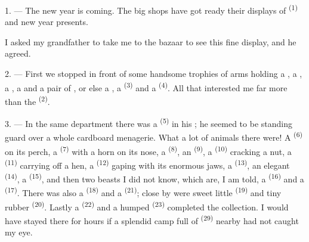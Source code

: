 %

\VUsaut{4.0mm}
\VUsaut{2.0mm}
\VUsaut{3.4mm}

1. --- The new year is coming. The big shops have got ready their displays of 
\textsuperscript{(1)} and new year presents.

I asked my grandfather to take me to the bazaar to see this fine display, and he agreed.

2. --- First we stopped in front of some handsome trophies of arms holding a , a
, a , a  and a pair of
, or else a , a
 \textsuperscript{(3)} and a  \textsuperscript{(4)}. All that
interested me far more than the  \textsuperscript{(2)}.

\VUsaut{3.0mm}
\VUsaut{2.6mm}

3. --- In the same department there was a  \textsuperscript{(5)} in his
; he seemed to be standing guard over a whole cardboard
menagerie. What a lot of animals there were! A  \textsuperscript{(6)} on its
perch, a  \textsuperscript{(7)} with a horn on its nose, a
 \textsuperscript{(8)}, an  \textsuperscript{(9)}, a 
\textsuperscript{(10)} cracking a nut, a  \textsuperscript{(11)} carrying off a
hen, a
 \textsuperscript{(12)} gaping with its enormous jaws, a
 \textsuperscript{(13)}, an elegant  \textsuperscript{(14)}, a
 \textsuperscript{(15)}, and then two beasts I did not know, which are, I
am told, a  \textsuperscript{(16)} and a  \textsuperscript{(17)}.
There was also a  \textsuperscript{(18)} and a 
\textsuperscript{(21)}; close by were sweet little  \textsuperscript{(19)} and
tiny rubber  \textsuperscript{(20)}. Lastly a 
\textsuperscript{(22)} and a humped
 \textsuperscript{(23)} completed the collection. I would have stayed
there for hours if a splendid camp full of
 \textsuperscript{(29)} nearby had not caught my eye.

